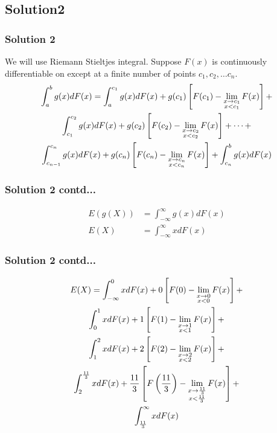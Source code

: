 \documentclass{beamer}
\begin{document}
\subsection*{Solution2}
\begin{frame}[fragile]
\frametitle{Solution 2}
\begin{flushleft}
We will use Riemann Stieltjes integral.\newline
Suppose $F(x)$ is continuously differentiable on  except at a finite number of points $c_1, c_2, \dots c_n$.
\begin{multline}
    \int_{a}^{b}g(x)dF(x) = \int_{a}^{c_1}g(x)dF(x) + g(c_1){}\left[F(c_1) - \lim_{\substack{x \to c_1 \\ x < c_1}}F(x)\right] + \\ \int_{c_1}^{c_2}g(x)dF(x) + g(c_2){}\left[F(c_2) - \lim_{\substack{x \to c_2 \\ x < c_2}}F(x)\right] + \dots +\\ \int_{c_{n-1}}^{c_n}g(x)dF(x) + g(c_n){}\left[F(c_n) - \lim_{\substack{x \to c_n \\ x < c_n}}F(x)\right] +  \int_{c_n}^{b}g(x)dF(x)
\end{multline}
\end{flushleft}
\end{frame}
\begin{frame}[fragile]
\frametitle{Solution 2 contd...}
\newline
\begin{align}
    E(g(X)) &= \int_{-\infty}^{\infty} g(x)dF(x)\\
    E(X) &= \int_{-\infty}^{\infty} xdF(x)
\end{align}
\end{frame}
\begin{frame}[fragile]
\frametitle{Solution 2 contd...}
\begin{flushleft}
\begin{multline}
    E(X) = \int_{-\infty}^{0}xdF(x) + 0{}\left[F(0) - \lim_{\substack{x \to 0 \\ x < 0}}F(x)\right] + \\ \int_{0}^{1}xdF(x) + 1{}\left[F(1) - \lim_{\substack{x \to 1 \\ x < 1}}F(x)\right] + \\ \int_{1}^{2}xdF(x) + 2{}\left[F(2) - \lim_{\substack{x \to 2 \\ x < 2}}F(x)\right] + \\ \int_{2}^{\frac{11}{3}}xdF(x) +  \frac{11}{3}{}\left[F\left(\frac{11}{3}\right) - \lim_{\substack{x \to \frac{11}{3} \\ x < \frac{11}{3}}}F(x)\right]+\\\int_{\frac{11}{3}}^{\infty}xdF(x)
\end{multline}
\end{flushleft}
\end{frame}
\end{document}
